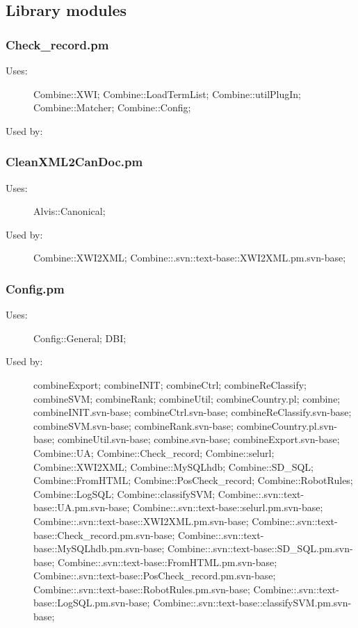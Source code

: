 \subsection{Library modules}
\subsubsection{Check\_record.pm}
\begin{description}
\item[Uses:] Combine::XWI; Combine::LoadTermList; Combine::utilPlugIn; Combine::Matcher; Combine::Config; 

\item[Used by:] 

\end{description}
\subsubsection{CleanXML2CanDoc.pm}
\begin{description}
\item[Uses:] Alvis::Canonical; 

\item[Used by:] Combine::XWI2XML; Combine::.svn::text-base::XWI2XML.pm.svn-base; 

\end{description}
\subsubsection{Config.pm}
\begin{description}
\item[Uses:] Config::General; DBI; 

\item[Used by:] combineExport; combineINIT; combineCtrl; combineReClassify; combineSVM; combineRank; combineUtil; combineCountry.pl; combine; combineINIT.svn-base; combineCtrl.svn-base; combineReClassify.svn-base; combineSVM.svn-base; combineRank.svn-base; combineCountry.pl.svn-base; combineUtil.svn-base; combine.svn-base; combineExport.svn-base; Combine::UA; Combine::Check\_record; Combine::selurl; Combine::XWI2XML; Combine::MySQLhdb; Combine::SD\_SQL; Combine::FromHTML; Combine::PosCheck\_record; Combine::RobotRules; Combine::LogSQL; Combine::classifySVM; Combine::.svn::text-base::UA.pm.svn-base; Combine::.svn::text-base::selurl.pm.svn-base; Combine::.svn::text-base::XWI2XML.pm.svn-base; Combine::.svn::text-base::Check\_record.pm.svn-base; Combine::.svn::text-base::MySQLhdb.pm.svn-base; Combine::.svn::text-base::SD\_SQL.pm.svn-base; Combine::.svn::text-base::FromHTML.pm.svn-base; Combine::.svn::text-base::PosCheck\_record.pm.svn-base; Combine::.svn::text-base::RobotRules.pm.svn-base; Combine::.svn::text-base::LogSQL.pm.svn-base; Combine::.svn::text-base::classifySVM.pm.svn-base; 

\end{description}
